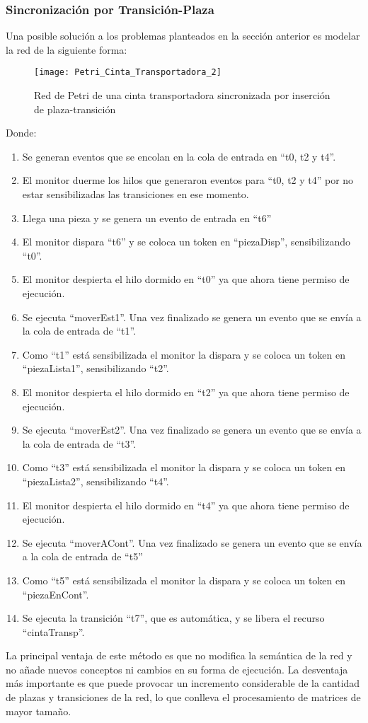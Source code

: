\subsubsection{Sincronización por Transición-Plaza}
Una posible solución a los problemas planteados en la sección anterior es
modelar la red de la siguiente forma:\\

\begin{figure}[H]
    \centering
    \texttt{[image: Petri\_Cinta\_Transportadora\_2]}
    \caption{Red de Petri de una cinta transportadora sincronizada por inserción
    de plaza-transición}
    \label{fig:petri_cinta_transportadora_2}
\end{figure}


Donde:\\
\begin{enumerate}
	\item Se generan eventos que se encolan en la cola de entrada en “t0, t2 y
		t4”.
	\item El monitor duerme los hilos que generaron eventos para “t0, t2 y t4” por
		no estar sensibilizadas las transiciones en ese momento.
	\item Llega una pieza y se genera un evento de entrada en “t6”
	\item El monitor dispara “t6” y se coloca un token en “piezaDisp”,
		sensibilizando “t0”.
	\item El monitor despierta el hilo dormido en “t0” ya que ahora tiene permiso
		de ejecución.
	\item Se ejecuta “moverEst1”. Una vez finalizado se genera un evento que se
		envía a la cola de entrada de “t1”.
	\item Como “t1” está sensibilizada el monitor la dispara y se coloca un token
		en “piezaLista1”, sensibilizando “t2”.
	\item El monitor despierta el hilo dormido en “t2” ya que ahora tiene permiso
		de ejecución.
	\item Se ejecuta “moverEst2”. Una vez finalizado se genera un evento que se
		envía a la cola de entrada de “t3”.
	\item Como “t3” está sensibilizada el monitor la dispara y se coloca un token
		en “piezaLista2”, sensibilizando “t4”.
	\item El monitor despierta el hilo dormido en “t4” ya que ahora tiene permiso
		de ejecución.
	\item Se ejecuta “moverACont”. Una vez finalizado se genera un evento que se
		envía a la cola de entrada de “t5”
	\item Como “t5” está sensibilizada el monitor la dispara y se coloca un token
		en ``piezaEnCont''.
	\item Se ejecuta la transición ``t7'', que es automática, y se libera el
		recurso ``cintaTransp''.
\end{enumerate}
La principal ventaja de este método es que no modifica la semántica de la red y
no añade nuevos conceptos ni cambios en su forma de ejecución.
La desventaja más importante es que puede provocar un incremento considerable de
la cantidad de plazas y transiciones de la red, lo que conlleva el
procesamiento de matrices de mayor tamaño.


